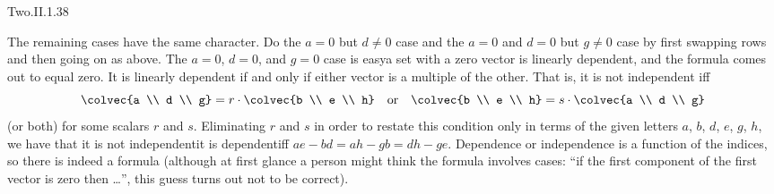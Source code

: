 \begin{ans}{Two.II.1.38}
\begin{exparts}
         The remaining cases have the same character.
         Do the \( a=0 \) but \( d\neq 0 \) case and the \( a=0 \) and
         \( d=0 \) but \( g\neq 0 \) case by first swapping rows and
         then going on as above.
         The \( a=0 \), \( d=0 \), and \( g=0 \) case is easy\Dash a set with a
         zero vector is linearly dependent, and the formula comes out
         to equal zero.
       \partsitem It is linearly dependent if and only if either vector is a
         multiple of the other.
         That is, it is not independent iff
         \begin{equation*}
           \colvec{a \\ d \\ g}=r\cdot\colvec{b \\ e \\ h}
           \quad\text{or}\quad
           \colvec{b \\ e \\ h}=s\cdot\colvec{a \\ d \\ g}
         \end{equation*}
         (or both) for some scalars $r$ and $s$.
         Eliminating $r$ and $s$ in order to restate this condition only in
         terms of the given letters $a$, $b$, $d$, $e$, $g$, $h$, we have that
         it is not independent\Dash it is dependent\Dash iff
         \( ae-bd=ah-gb=dh-ge \).
       \partsitem Dependence or independence is a function of the
         indices, so there
         is indeed a formula (although at first glance a person might think
         the formula involves cases: ``if the first component of the first
         vector is zero then \ldots'', this guess turns out not to be
         correct).
      \end{exparts}
    
\end{ans}
